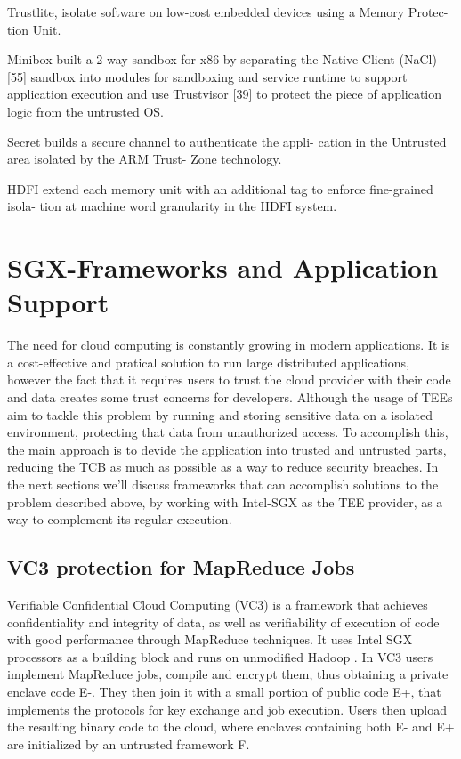 Trustlite, isolate software
on low-cost embedded devices using a Memory Protec-
tion Unit.

Minibox built a 2-way sandbox for x86
by separating the Native Client (NaCl) [55] sandbox into
modules for sandboxing and service runtime to support
application execution and use Trustvisor [39] to protect
the piece of application logic from the untrusted OS.

Secret builds a secure channel to authenticate the appli-
cation in the Untrusted area isolated by the ARM Trust-
Zone technology.

HDFI extend each memory
unit with an additional tag to enforce fine-grained isola-
tion at machine word granularity in the HDFI system.








\section{SGX-Frameworks and Application Support} %
\label{sec:sgx_frameworks}


The need for cloud computing is constantly growing in modern applications. It is a cost-effective and pratical solution to run large distributed applications, however the fact that it requires users to trust the cloud provider with their code and data creates some trust concerns for developers.
Although the usage of TEEs aim to tackle this problem by running and storing sensitive data on a isolated environment, protecting that data from unauthorized access. To accomplish this, the main approach is to devide the application into trusted and untrusted parts, reducing the TCB as much as possible as a way to reduce security breaches. 
In the next sections we'll discuss frameworks that can accomplish solutions to the problem described above, by working with Intel-SGX as the TEE provider, as a way to complement its regular execution.




\subsection{VC3 protection for MapReduce Jobs}
\label{ssec:vc3_mapreduce}

Verifiable Confidential Cloud Computing (VC3) \cite{vc3Paper} is a framework that achieves confidentiality and integrity of data, as well as verifiability of execution of code with good performance through MapReduce \cite{mapReduce} techniques. It uses Intel SGX processors as a building block and runs on unmodified Hadoop \cite{hadoop}.
In VC3 users implement MapReduce jobs, compile and encrypt them, thus obtaining a private enclave code E-. They then join it with a small portion of public code E+, that implements the protocols for key exchange and job execution.
Users then upload the resulting binary code to the cloud, where enclaves containing both E- and E+ are initialized by an untrusted framework F. 

